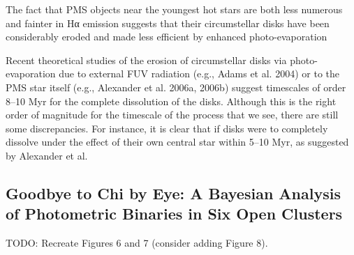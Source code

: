 \documentclass[../main.tex]{subfiles}
\begin{document}
{The fact that PMS objects near the youngest hot stars are both
less numerous and fainter in Hα emission suggests that their
circumstellar disks have been considerably eroded and made
less efficient by enhanced photo-evaporation

Recent theoretical studies of the erosion of circumstellar
disks via photo-evaporation due to external FUV radiation (e.g.,
Adams et al. 2004) or to the PMS star itself (e.g., Alexander
et al. 2006a, 2006b) suggest timescales of order 8–10 Myr for
the complete dissolution of the disks. Although this is the right
order of magnitude for the timescale of the process that we see,
there are still some discrepancies. For instance, it is clear that if
disks were to completely dissolve under the effect of their own
central star within 5–10 Myr, as suggested by Alexander et al.


\subsection{Goodbye to Chi by Eye: A Bayesian Analysis of Photometric Binaries in Six Open Clusters}


TODO: Recreate Figures 6 and 7 (consider adding Figure 8).

}
\end{document}

